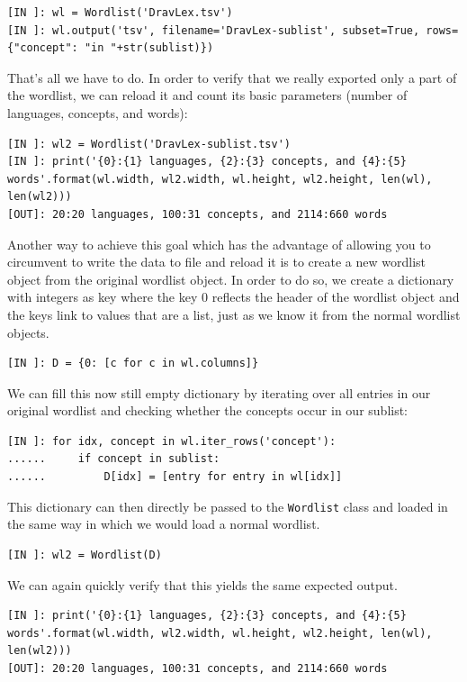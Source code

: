 \documentclass[
  a4paper,
  14pt,
  oneside,
  tablecaptionabove
]{scrbook}
\begin{document}
\begin{lstlisting}
[IN ]: wl = Wordlist('DravLex.tsv')
[IN ]: wl.output('tsv', filename='DravLex-sublist', subset=True, rows={"concept": "in "+str(sublist)})
\end{lstlisting}

That's all we have to do. In order to verify that we really exported
only a part of the wordlist, we can reload it and count its basic
parameters (number of languages, concepts, and words):

\begin{lstlisting}
[IN ]: wl2 = Wordlist('DravLex-sublist.tsv') 
[IN ]: print('{0}:{1} languages, {2}:{3} concepts, and {4}:{5} words'.format(wl.width, wl2.width, wl.height, wl2.height, len(wl), len(wl2))) 
[OUT]: 20:20 languages, 100:31 concepts, and 2114:660 words
\end{lstlisting}

Another way to achieve this goal which has the advantage of allowing you
to circumvent to write the data to file and reload it is to create a new
wordlist object from the original wordlist object. In order to do so, we
create a dictionary with integers as key where the key 0 reflects the
header of the wordlist object and the keys link to values that are a
list, just as we know it from the normal wordlist objects.

\begin{lstlisting}
[IN ]: D = {0: [c for c in wl.columns]}
\end{lstlisting}

We can fill this now still empty dictionary by iterating over all
entries in our original wordlist and checking whether the concepts occur
in our sublist:

\begin{lstlisting}
[IN ]: for idx, concept in wl.iter_rows('concept'):
......     if concept in sublist:
......         D[idx] = [entry for entry in wl[idx]] 
\end{lstlisting}

This dictionary can then directly be passed to the \lstinline!Wordlist!
class and loaded in the same way in which we would load a normal
wordlist.

\begin{lstlisting}
[IN ]: wl2 = Wordlist(D)
\end{lstlisting}

We can again quickly verify that this yields the same expected output.

\begin{lstlisting}
[IN ]: print('{0}:{1} languages, {2}:{3} concepts, and {4}:{5} words'.format(wl.width, wl2.width, wl.height, wl2.height, len(wl), len(wl2))) 
[OUT]: 20:20 languages, 100:31 concepts, and 2114:660 words
\end{lstlisting}
\end{document}

